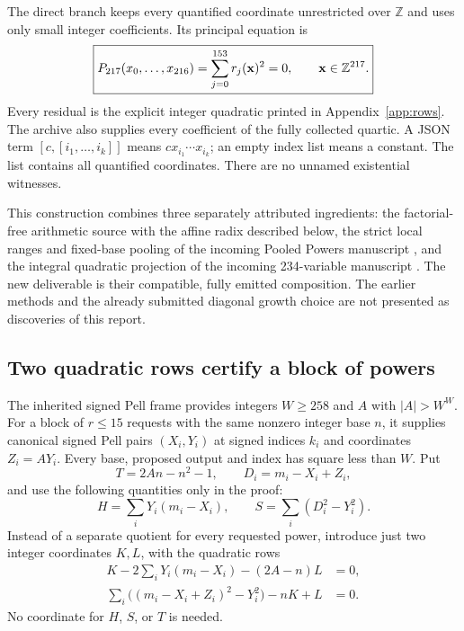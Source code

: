 The direct branch keeps every quantified coordinate unrestricted over
$\mathbb Z$ and uses only small integer coefficients. Its principal
equation is
\begin{equation}\label{eq:principal}
 \boxed{\displaystyle
 P_{217}(x_0,\ldots,x_{216})
   =\sum_{j=0}^{153}r_j(\mathbf x)^2=0,
 \qquad\mathbf x\in\mathbb Z^{217}.}
\end{equation}
Every residual is the explicit integer quadratic printed in
Appendix~\ref{app:rows}. The archive also supplies every coefficient of
the fully collected quartic. A JSON term $[c,[i_1,\ldots,i_k]]$ means
$cx_{i_1}\cdots x_{i_k}$; an empty index list means a constant.
The list contains all quantified coordinates. There are no unnamed
existential witnesses.

This construction combines three separately attributed ingredients:
the factorial-free arithmetic source with the affine radix described
below, the strict local ranges and fixed-base pooling of the incoming
Pooled Powers manuscript \cite{pooled}, and the integral quadratic
projection of the incoming 234-variable manuscript \cite{projection}.
The new deliverable is their compatible, fully emitted composition.
The earlier methods and the already submitted diagonal growth choice
are not presented as discoveries of this report.

\subsection{Two quadratic rows certify a block of powers}

The inherited signed Pell frame provides integers $W\ge258$ and $A$
with $|A|>W^W$. For a block of $r\le15$ requests with the same
nonzero integer base $n$, it supplies canonical signed Pell pairs
$(X_i,Y_i)$ at signed indices $k_i$ and coordinates $Z_i=AY_i$.
Every base, proposed output and index has square less than $W$.
Put
\[
 T=2An-n^2-1,\qquad D_i=m_i-X_i+Z_i,
\]
and use the following quantities only in the proof:
\[
 H=\sum_iY_i(m_i-X_i),\qquad
 S=\sum_i(D_i^2-Y_i^2).
\]
Instead of a separate quotient for every requested power, introduce
just two integer coordinates $K,L$, with the quadratic rows
\begin{align}
 K-2\sum_iY_i(m_i-X_i)-(2A-n)L&=0,\label{eq:pool1}\\
 \sum_i\bigl((m_i-X_i+Z_i)^2-Y_i^2\bigr)-nK+L&=0.
 \label{eq:pool2}
\end{align}
No coordinate for $H$, $S$, or $T$ is needed.

